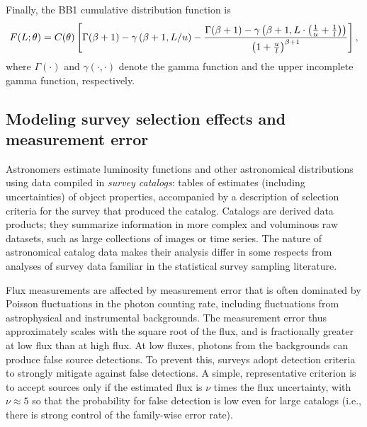 Finally, the BB1 cumulative distribution function is 
\begin{equation}
\label{eq:lumCDF} 
F(L ; \theta) = 
  C(\theta)
  \left[ \Gamma(\beta + 1) - \gamma\left(\beta + 1, L/u\right) - \frac{\Gamma(\beta + 1)-\gamma\left(\beta + 1, L\cdot\left(\frac{1}{u}+\frac{1}{l}\right)\right)}{\left(1 + \frac{u}{l}\right)^{\beta + 1}} \right],
\end{equation}
where $\Gamma(\cdot)$ and $\gamma(\cdot, \cdot)$ denote the gamma function and the upper incomplete gamma function, respectively.

\subsection{Modeling survey selection effects and measurement error}
\label{sec:slxn+err}

Astronomers estimate luminosity functions and other astronomical distributions using data compiled in \emph{survey catalogs}: tables of estimates (including uncertainties) of object properties, accompanied by a description of selection criteria for the survey that produced the catalog.
Catalogs are derived data products; they summarize information in more complex and voluminous raw datasets, such as large collections of images or time series.
The nature of astronomical catalog data makes their analysis differ in some respects from analyses of survey data familiar in the statistical survey sampling literature.

Flux measurements are affected by measurement error that is often dominated by Poisson fluctuations in the photon counting rate, including fluctuations from astrophysical and instrumental backgrounds.
The measurement error thus approximately scales with the square root of the flux, and is fractionally greater at low flux than at high flux.
At low fluxes, photons from the backgrounds can produce false source detections.
To prevent this, surveys adopt detection criteria to strongly mitigate against false detections.
A simple, representative criterion is to accept sources only if the estimated flux is $\nu$ times the flux uncertainty, with $\nu \approx 5$ so that the probability for false detection is low even for large catalogs (i.e., there is strong control of the family-wise error rate).

